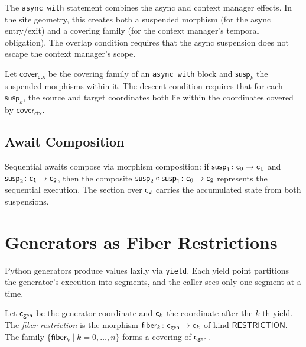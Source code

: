 \documentclass[11pt]{article}
\newcommand{\susp}{\mathsf{susp}}        %
\newcommand{\fiber}{\mathsf{fiber}}      %
\newcommand{\cover}{\mathsf{cover}}      %
\begin{document}
The \texttt{async with} statement combines the async and context
manager effects.  In the site geometry, this creates both a suspended
morphism (for the async entry/exit) and a covering family (for the
context manager's temporal obligation).  The overlap condition requires
that the async suspension does not escape the context manager's scope.

\begin{lemma}\label{lem:async-ctx}
Let $\cover_{\mathsf{ctx}}$ be the covering family of an
\texttt{async with} block and $\susp_k$ the suspended morphisms
within it.  The descent condition requires that for each $\susp_k$,
the source and target coordinates both lie within the coordinates
covered by $\cover_{\mathsf{ctx}}$.
\end{lemma}

\subsection{Await Composition}

Sequential awaits compose via morphism composition: if
$\susp_1 \colon \coord_0 \to \coord_1$ and
$\susp_2 \colon \coord_1 \to \coord_2$, then the composite
$\susp_2 \circ \susp_1 \colon \coord_0 \to \coord_2$ represents
the sequential execution.  The section over $\mathsf{c}_2$ carries the
accumulated state from both suspensions.

\section{Generators as Fiber Restrictions}\label{sec:generators}

Python generators produce values lazily via \texttt{yield}.  Each
yield point partitions the generator's execution into segments, and
the caller sees only one segment at a time.

\begin{definition}\label{def:fiber}
Let $\mathsf{c}_{\mathsf{gen}}$ be the generator coordinate and
$\mathsf{c}_k$ the coordinate after the $k$-th yield.  The
\emph{fiber restriction} is the morphism
$\fiber_k \colon \coord_{\mathsf{gen}} \to \coord_k$ of kind
$\mathsf{RESTRICTION}$.  The family
$\{\fiber_k \mid k = 0, \ldots, n\}$ forms a covering of
$\mathsf{c}_{\mathsf{gen}}$.
\end{definition}
\end{document}

